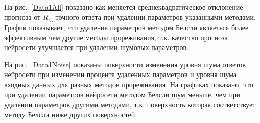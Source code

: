 На рис.~\ref{Data1All} показано как меняется среднеквадратическое отклонение прогноза от $R_{\text{rg}}$ точного ответа при удалении параметров указанными методами. График показывает, что удаление параметров методом Белсли являеться более эффективным чем другие методы прореживания, т.к. качество прогноза нейросети улучшается при удалении шумовых параметров.

На рис.~\ref{Data1Noise} показаны поверхности изменения уровня шума ответов нейросети при изменении процента удаленных параметров и уровня шума входных данных для разных методов прореживания. На графиках показано, что при удалении параметров нейросети методом Белсли шум меньше, чем при удалении параметров другими методами, т.к. поверхность которая соответствует методу Белсли ниже других поверхностей.

